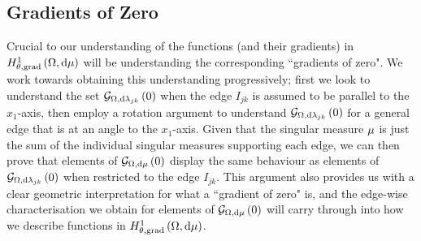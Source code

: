 
\subsection{Gradients of Zero} \label{ssec:GradsOfZeroTheory}
Crucial to our understanding of the functions (and their gradients) in $H^1_{\theta, \mathrm{grad}}\left( \Omega, \mathrm{d}\mu \right)$ will be understanding the corresponding ``gradients of zero".
We work towards obtaining this understanding progressively; first we look to understand the set $\mathcal{G}_{ \Omega, \mathrm{d}\lambda_{jk}}\left( 0 \right)$ when the edge $I_{jk}$ is assumed to be parallel to the $x_1$-axis, then employ a rotation argument to understand $\mathcal{G}_{ \Omega, \mathrm{d}\lambda_{jk}}\left( 0 \right)$ for a general edge that is at an angle to the $x_1$-axis.
Given that the singular measure $\mu$ is just the sum of the individual singular measures supporting each edge, we can then prove that elements of $\mathcal{G}_{ \Omega, \mathrm{d}\mu}\left( 0 \right)$ display the same behaviour as elements of $\mathcal{G}_{ \Omega, \mathrm{d}\lambda_{jk}}\left( 0 \right)$ when restricted to the edge $I_{jk}$.
This argument also provides us with a clear geometric interpretation for what a ``gradient of zero" is, and the edge-wise characterisation we obtain for elements of $\mathcal{G}_{ \Omega, \mathrm{d}\mu}\left( 0 \right)$ will carry through into how we describe functions in $H^1_{\theta, \mathrm{grad}}\left( \Omega, \mathrm{d}\mu \right)$.

